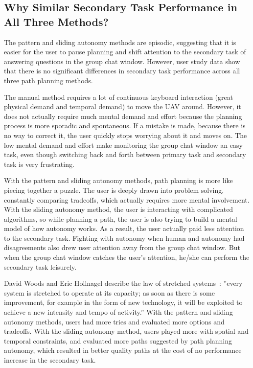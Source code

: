 \documentclass[lettersize, apacite, twoside, HRI]{apa_HRI}
\begin{document}
\subsection{Why Similar Secondary Task Performance in All Three Methods?}

The pattern and sliding autonomy methods are episodic, suggesting that it is easier for the user to pause planning and shift attention to the secondary task of answering questions in the group chat window. However, user study data show that there is no significant differences in secondary task performance across all three path planning methods.

The manual method requires a lot of continuous keyboard interaction (great physical demand and temporal demand) to move the UAV around. However, it does not actually require much mental demand and effort because the planning process is more sporadic and spontaneous. If a mistake is made, because there is no way to correct it, the user quickly stops worrying about it and moves on. The low mental demand and effort make monitoring the group chat window an easy task, even though switching back and forth between primary task and secondary task is very frustrating.

With the pattern and sliding autonomy methods, path planning is more like piecing together a puzzle. The user is deeply drawn into problem solving, constantly comparing tradeoffs, which actually requires more mental involvement. With the sliding autonomy method, the user is interacting with complicated algorithms, so while planning a path, the user is also trying to build a mental model of how autonomy works. As a result, the user actually paid less attention to the secondary task. Fighting with autonomy when human and autonomy had disagreements also drew user attention away from the group chat window. But when the group chat window catches the user's attention, he/she can perform the secondary task leisurely.

David Woods and Eric Hollnagel describe the law of stretched systems~\cite{Woods2006Joint}: ''every system is stretched to operate at its capacity; as soon as there is some improvement, for example in the form of new technology, it will be exploited to achieve a new intensity and tempo of activity.'' With the pattern and sliding autonomy methods, users had more tries and evaluated more options and tradeoffs. With the sliding autonomy method, users played more with spatial and temporal constraints, and evaluated more paths suggested by path planning autonomy, which resulted in better quality paths at the cost of no performance increase in the secondary task.
\end{document}
